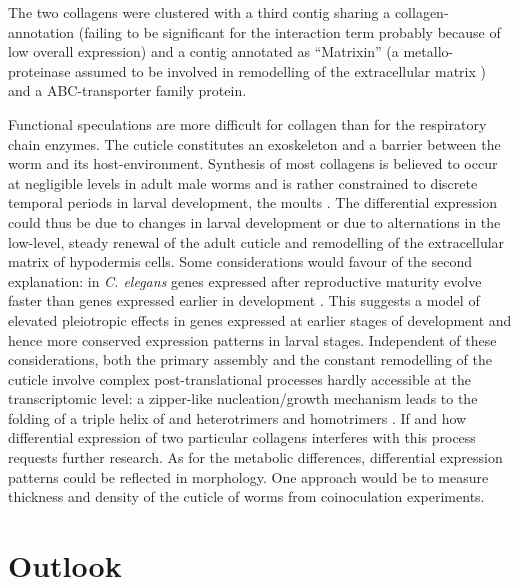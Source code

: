 The two collagens were clustered with a third contig sharing a
collagen-annotation (failing to be significant for the interaction
term probably because of low overall expression) and a contig
annotated as ``Matrixin'' (a metallo-proteinase assumed to be involved
in remodelling of the extracellular matrix \cite{mealloprot}) and a
ABC-transporter family protein. 

Functional speculations are more difficult for collagen than for the
respiratory chain enzymes. The cuticle constitutes an exoskeleton and
a barrier between the worm and its host-environment. Synthesis of most
collagens is believed to occur at negligible levels in adult male
worms and is rather constrained to discrete temporal periods in larval
development, the moults \cite{pmid10637627}. The differential
expression could thus be due to changes in larval development or due
to alternations in the low-level, steady renewal of the adult cuticle
and remodelling of the extracellular matrix of hypodermis cells. Some
considerations would favour of the second explanation: in
\textit{C. elegans} genes expressed after reproductive maturity evolve
faster than genes expressed earlier in development
\cite{pmid15371532}. This suggests a model of elevated pleiotropic
effects in genes expressed at earlier stages of development and hence
more conserved expression patterns in larval stages. Independent of
these considerations, both the primary assembly and the constant
remodelling of the cuticle involve complex post-translational
processes hardly accessible at the transcriptomic level: a zipper-like
nucleation/growth mechanism leads to the folding of a triple helix of
and heterotrimers and homotrimers \cite{kennedy2001parasitic}. If and
how differential expression of two particular collagens interferes
with this process requests further research. As for the metabolic
differences, differential expression patterns could be reflected in
morphology. One approach would be to measure thickness and density of
the cuticle of worms from coinoculation experiments.

\section{Outlook}


